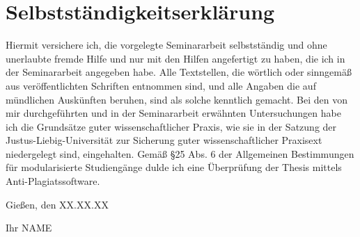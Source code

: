 \section*{Selbstständigkeitserklärung}
\thispagestyle{empty}
Hiermit versichere ich, die vorgelegte Seminararbeit selbstständig und ohne unerlaubte fremde Hilfe und nur mit den Hilfen angefertigt zu haben, die ich in der Seminararbeit angegeben habe. Alle Textstellen, die wörtlich oder sinngemäß aus veröffentlichten Schriften entnommen sind, und alle Angaben die auf mündlichen Auskünften beruhen, sind als solche kenntlich gemacht. Bei den von mir durchgeführten und in der Seminararbeit erwähnten Untersuchungen habe ich die Grundsätze guter wissenschaftlicher Praxis, wie sie in der \glqq Satzung der Justus-Liebig-Universität zur Sicherung guter wissenschaftlicher Praxisext\grqq{} niedergelegt sind, eingehalten. Gemäß \S 25 Abs. 6 der Allgemeinen Bestimmungen für modularisierte Studiengänge dulde ich eine Überprüfung der Thesis mittels Anti-Plagiatssoftware.
\bigskip

\raggedright{Gießen, den XX.XX.XX} \bigskip \bigskip \bigskip

Ihr NAME
